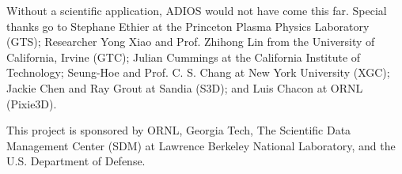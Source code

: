 \vspace{6pt}
Without a scientific application, ADIOS would not have come this far. Special thanks 
go to Stephane Ethier at the Princeton Plasma Physics Laboratory (GTS); Researcher 
Yong Xiao and Prof. Zhihong Lin from the University of California, Irvine (GTC); 
Julian Cummings at the California Institute of Technology; Seung-Hoe and Prof. 
C. S. Chang at New York University (XGC); Jackie Chen and Ray Grout at Sandia (S3D); 
and Luis Chacon at ORNL (Pixie3D). 

\vspace{6pt}
This project is sponsored by ORNL, Georgia Tech, The Scientific Data Management 
Center (SDM) at Lawrence Berkeley National Laboratory, and the U.S. Department 
of Defense. 

%

